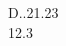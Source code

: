 \documentclass{standalone}
\begin{document}
\begin{tabular}{D{.}{.}{2}}1.23\\12.3\end{tabular}
\end{document}
